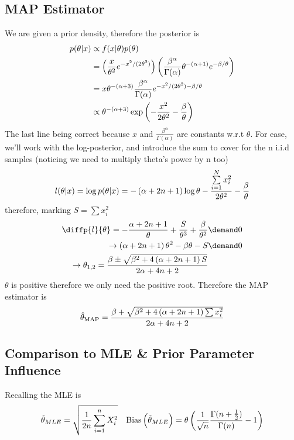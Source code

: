 \subsection{MAP Estimator}
We are given a prior density, therefore the posterior is
\begin{align}
	p(\theta\vert x) &\propto f(x\vert\theta)p(\theta)\\
	&= \left(\frac{x}{\theta^2}e^{-x^2/(2\theta^2)}\right)\left(\frac{\beta^\alpha}{\Gamma(\alpha)}\theta^{-(\alpha+1)}e^{-\beta/\theta}\right)\\
	&= x\theta^{-\left(\alpha+3\right)}\frac{\beta^\alpha}{\Gamma(\alpha)}e^{-x^2/(2\theta^2)-\beta/\theta}\\
	&\propto \theta^{-\left(\alpha+3\right)}\exp\left(-\frac{x^2}{2\theta^2}-\frac{\beta}{\theta}\right)
\end{align}
The last line being correct because $x$ and $\frac{\beta^\alpha}{\Gamma(\alpha)}$ are constants w.r.t $\theta$. For ease, we'll work with the log-posterior, and introduce the sum to cover for the n i.i.d samples (noticing we need to multiply theta's power by n too)
\begin{equation}
	l(\theta\vert x) = \log p(\theta\vert x) = -\left(\alpha+2n+1\right)\log\theta-\frac{\sum\limits_{i=1}^N x_i^2}{2\theta^2}-\frac{\beta}{\theta}
\end{equation}
therefore, marking $S=\sum x_i^2$
\begin{align}
	\diffp{l}{\theta}=-\frac{\alpha+2n+1}{\theta}+\frac{S}{\theta^3}+\frac{\beta}{\theta^2} &\demand 0\\
	\rightarrow \ins{\alpha+2n+1}\theta^2-\beta\theta-S &\demand 0\\
	\rightarrow \theta_{1,2} = \frac{\beta\pm\sqrt{\beta^2+4\ins{\alpha+2n+1}S}}{2\alpha+4n+2}
\end{align}
$\theta$ is positive therefore we only need the positive root. Therefore the MAP estimator is 
\begin{equation}
	\hat\theta_{\text{MAP}} = \frac{\beta+\sqrt{\beta^2+4\left(\alpha+2n+1\right)\sum x_i^2}}{2\alpha+4n+2}
\end{equation}

\newpage
\subsection{Comparison to MLE \& Prior Parameter Influence}
Recalling the MLE is 
\begin{align}
	\hat\theta_{MLE} = \sqrt{\frac{1}{2n}\sum\limits_{i=1}^nX_i^2} && \text{Bias}\left(\hat\theta_{MLE}\right)=\theta\left(\frac{1}{\sqrt{n}}\frac{\Gamma(n+\frac{1}{2})}{\Gamma(n)}-1\right)
\end{align}

